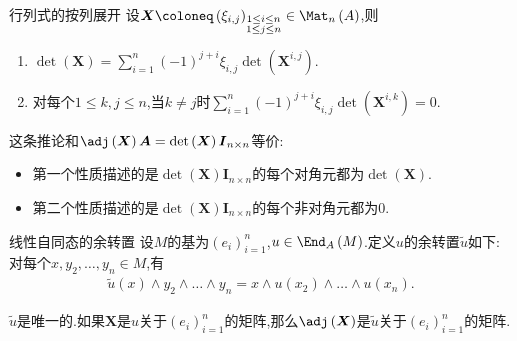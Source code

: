 \begin{corollary}{行列式的按列展开}{}
	设$\boldsymbol{X}\coloneq\left(\xi_{i,j}\right)_{\substack{1\leq i\leq n\\1\leq j\leq n}}\in\Mat_{n}\left(A\right)$,则
	\begin{enumerate}
		\item $\det\left(\boldsymbol{X}\right)=\sum\limits_{i=1}^{n}\left(-1\right)^{j+i}\xi_{i,j}\det\left(\boldsymbol{X}^{i,j}\right)$.
		\item 对每个$1\leq k,j\leq n$,当$k\neq j$时$\sum\limits_{i=1}^{n}\left(-1\right)^{j+i}\xi_{i,j}\det\left(\boldsymbol{X}^{i,k}\right)=0$.
	\end{enumerate}
\end{corollary}

\begin{remark}{}{}
	这条推论和$\adj\left(\boldsymbol{X}\right)\boldsymbol{A}=\det\left(\boldsymbol{X}\right)\boldsymbol{I}_{n\times n}$等价:
	\begin{itemize}
		\item 第一个性质描述的是$\det\left(\boldsymbol{X}\right)\boldsymbol{I}_{n\times n}$的每个对角元都为$\det\left(\boldsymbol{X}\right)$.
		\item 第二个性质描述的是$\det\left(\boldsymbol{X}\right)\boldsymbol{I}_{n\times n}$的每个非对角元都为$0$.
	\end{itemize}
\end{remark}

\begin{definition}{线性自同态的余转置}{}
	设$M$的基为$\left(e_{i}\right)_{i=1}^{n}$,$u\in\End_{A}\left(M\right)$.定义$u$的余转置$\tilde{u}$如下:对每个$x,y_{2},\ldots,y_{n}\in M$,有
	\begin{align*}
		\tilde{u}\left(x\right)\wedge y_{2}\wedge\ldots\wedge y_{n}=x\wedge u\left(x_{2}\right)\wedge\ldots\wedge u\left(x_{n}\right).
	\end{align*}
\end{definition}

\begin{remark}{}{}
	$\tilde{u}$是唯一的.如果$\boldsymbol{X}$是$u$关于$\left(e_{i}\right)_{i=1}^{n}$的矩阵,那么$\adj\left(\boldsymbol{X}\right)$是$\tilde{u}$关于$\left(e_{i}\right)_{i=1}^{n}$的矩阵.
\end{remark}

